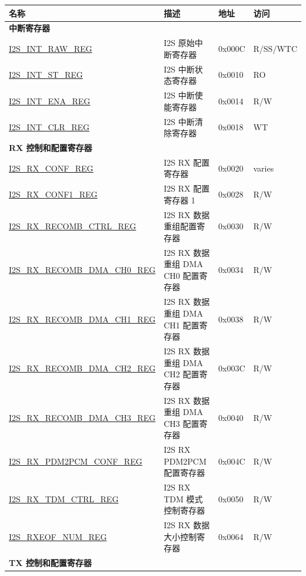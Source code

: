 \begin{longtable}{ | p{5.5cm} | p{7cm} | p{1.3cm} | p{2cm} | }
\hline\rowcolor{lightgray}
\textbf{名称} & \textbf{描述} &  \textbf{地址} & \textbf{访问} \\ \hline
\endhead
\multicolumn{4}{|l|}{\textbf{中断寄存器}} \\ \hline
\hyperref[regdesc:I2SINTRAWREG]{I2S\_INT\_RAW\_REG} & I2S 原始中断寄存器 & 0x000C & R/SS/WTC \\ \hline
\hyperref[regdesc:I2SINTSTREG]{I2S\_INT\_ST\_REG} & I2S 中断状态寄存器 & 0x0010 & RO \\ \hline
\hyperref[regdesc:I2SINTENAREG]{I2S\_INT\_ENA\_REG} & I2S 中断使能寄存器 & 0x0014 & R/W \\ \hline
\hyperref[regdesc:I2SINTCLRREG]{I2S\_INT\_CLR\_REG} & I2S 中断清除寄存器 & 0x0018 & WT \\ \hline
\multicolumn{4}{|l|}{\textbf{RX 控制和配置寄存器}} \\ \hline
\hyperref[regdesc:I2SRXCONFREG]{I2S\_RX\_CONF\_REG} & I2S RX 配置寄存器 & 0x0020 & varies \\ \hline
\hyperref[regdesc:I2SRXCONF1REG]{I2S\_RX\_CONF1\_REG} & I2S RX 配置寄存器 1 & 0x0028 & R/W \\ \hline
\hyperref[regdesc:I2SRXRECOMBCTRLREG]{I2S\_RX\_RECOMB\_CTRL\_REG} & I2S RX 数据重组配置寄存器 & 0x0030 & R/W \\ \hline
\hyperref[regdesc:I2SRXRECOMBDMACH0REG]{I2S\_RX\_RECOMB\_DMA\_CH0\_REG} & I2S RX 数据重组 DMA CH0 配置寄存器 & 0x0034 & R/W \\ \hline
\hyperref[regdesc:I2SRXRECOMBDMACH1REG]{I2S\_RX\_RECOMB\_DMA\_CH1\_REG} & I2S RX 数据重组 DMA CH1 配置寄存器 & 0x0038 & R/W \\ \hline
\hyperref[regdesc:I2SRXRECOMBDMACH2REG]{I2S\_RX\_RECOMB\_DMA\_CH2\_REG} & I2S RX 数据重组 DMA CH2 配置寄存器 & 0x003C & R/W \\ \hline
\hyperref[regdesc:I2SRXRECOMBDMACH3REG]{I2S\_RX\_RECOMB\_DMA\_CH3\_REG} & I2S RX 数据重组 DMA CH3 配置寄存器 & 0x0040 & R/W \\ \hline
\hyperref[regdesc:I2SRXPDM2PCMCONFREG]{I2S\_RX\_PDM2PCM\_CONF\_REG} & I2S RX PDM2PCM 配置寄存器 & 0x004C & R/W \\ \hline
\hyperref[regdesc:I2SRXTDMCTRLREG]{I2S\_RX\_TDM\_CTRL\_REG} & I2S RX TDM 模式控制寄存器 & 0x0050 & R/W \\ \hline
\hyperref[regdesc:I2SRXEOFNUMREG]{I2S\_RXEOF\_NUM\_REG} & I2S RX 数据大小控制寄存器 & 0x0064 & R/W \\ \hline
\multicolumn{4}{|l|}{\textbf{TX 控制和配置寄存器}} \\ \hline

\end{longtable}
